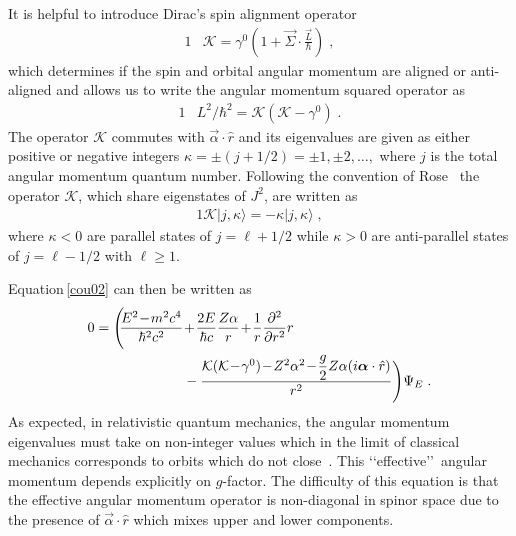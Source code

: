 \documentclass[epj]{svjour}
\begin{document}
It is helpful to introduce Dirac\rq s spin alignment operator
\begin{alignat}{1}
\label{cou04} &\mathcal{K}=\gamma^{0}\left(1+\vec{\Sigma}\cdot\frac{\vec{L}}{\hbar}\right)\;,\end{alignat}
which determines if the spin and orbital angular momentum are aligned or anti-aligned and allows us to write the angular momentum squared operator as
\begin{alignat}{1}
\label{cou05} &L^{2}/\hbar^{2}=\mathcal{K}\left(\mathcal{K}-\gamma^{0}\right)\;.
\end{alignat}
The operator $\mathcal{K}$ commutes with $\vec{\alpha}\cdot\hat{r}$ and its eigenvalues are given as either positive or negative integers $\kappa=\pm(j+1/2)=\pm1,\pm2,\ldots,$ where $j$ is the total angular momentum quantum number. Following the convention of Rose~\cite{r61} the operator $\mathcal{K}$, which share eigenstates of $J^{2}$, are written as
\begin{alignat}{1}
\label{cou18} \mathcal{K}|j,\kappa\rangle =-\kappa|j,\kappa\rangle\;,
\end{alignat}
where $\kappa<0$ are parallel states of $j=\ell+1/2$ while $\kappa>0$ are anti-parallel states of $j=\ell-1/2$ with $\ell\geq1$. 

Equation\,\eqref{cou02} can then be written as
\begin{alignat}{1}
\label{cou06} 0=\Bigg(\!\!\frac{E^{2}\!-\!m^{2}c^{4}}{\hbar^{2}c^{2}}&\!+\!\frac{2E}{\hbar c}\frac{Z\alpha}{r}\!+\!\frac{1}{r}\frac{\partial^{2}}{\partial r^{2}}r\\ \notag &-\frac{\mathcal{K}(\mathcal{K}\!-\!\gamma^{0})\!-\!Z^{2}\alpha^{2}\!-\!\displaystyle\frac{g}{2}Z\alpha(i\vec{\alpha}\cdot\hat{r})}{r^{2}}\Bigg)\Psi_{E}\;.
\end{alignat}
As expected, in relativistic quantum mechanics, the angular momentum eigenvalues must take on non-integer values which in the limit of classical mechanics corresponds to orbits which do not close~\cite{b69}. This \lq\lq effective\rq\rq\ angular momentum depends explicitly on $g$-factor. The difficulty of this equation is that the effective angular momentum operator is non-diagonal in spinor space due to the presence of $\vec{\alpha}\cdot\hat{r}$ which mixes upper and lower components. 
\end{document}
